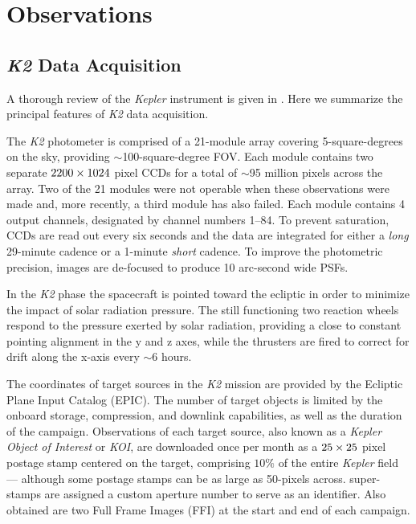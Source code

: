 \documentclass[apjl]{emulateapj}
\begin{document}
\section{Observations}
\label{sec:obs}
\subsection{\textit{K2} Data Acquisition}
\label{subsec:acq}

A thorough review of the \textit{Kepler} instrument is given in
.  Here we summarize the principal
features of \textit{K2} data acquisition.

The \textit{K2} photometer is comprised of a 21-module array covering
5-square-degrees on the sky, providing $\sim$100-square-degree FOV.
Each module contains two separate $\rm 2200 \times 1024$ pixel CCDs for
a total of $\sim$95 million pixels across the array.  Two of the 21
modules were not operable when these observations were made and, more
recently, a third module has also failed.  Each module contains 4 output
channels, designated by channel numbers 1--84.  To prevent saturation,
CCDs are read out every six seconds and the data are integrated for either
a \textit{long} 29-minute cadence or a 1-minute \textit{short} cadence.
To improve the photometric precision, images are de-focused to produce
10 arc-second wide PSFs.

In the \textit{K2} phase the spacecraft is pointed toward the ecliptic
in order to minimize the impact of solar radiation pressure.  The still
functioning two reaction wheels respond to the pressure exerted by solar
radiation, providing a close to constant pointing alignment in the y and
z axes, while the thrusters are fired to correct for drift along the
x-axis every $\sim 6$ hours.

The coordinates of target sources in the \textit{K2} mission are
provided by the Ecliptic Plane Input Catalog (EPIC).  The number of
target objects is limited by the onboard storage, compression, and
downlink capabilities, as well as the duration of the campaign.
Observations of each target source, also known as a \textit{Kepler
  Object of Interest} or \textit{KOI}, are downloaded once per month as
a $\rm 25 \times 25$ pixel postage stamp centered on the target,
comprising $10 \%$ of the entire \textit{Kepler} field --- although some
postage stamps can be as large as 50-pixels across.  super-stamps are
assigned a custom aperture number to serve as an identifier.  Also
obtained are two Full Frame Images (FFI) at the start and end of each
campaign.
\end{document}
